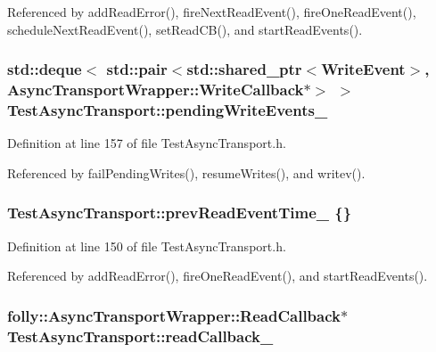 Referenced by add\+Read\+Error(), fire\+Next\+Read\+Event(), fire\+One\+Read\+Event(), schedule\+Next\+Read\+Event(), set\+Read\+C\+B(), and start\+Read\+Events().

\subsubsection[{pending\+Write\+Events\+\_\+}]{\setlength{\rightskip}{0pt plus 5cm}std\+::deque$<$ std\+::pair$<$std\+::shared\+\_\+ptr$<${\bf Write\+Event}$>$, Async\+Transport\+Wrapper\+::\+Write\+Callback$\ast$$>$ $>$ Test\+Async\+Transport\+::pending\+Write\+Events\+\_\+\hspace{0.3cm}{\ttfamily [private]}}\label{classTestAsyncTransport_a6fdd9f307a5b68f33fd5b19a46805661}


Definition at line 157 of file Test\+Async\+Transport.\+h.



Referenced by fail\+Pending\+Writes(), resume\+Writes(), and writev().

\subsubsection[{prev\+Read\+Event\+Time\+\_\+}]{ Test\+Async\+Transport\+::prev\+Read\+Event\+Time\+\_\+ \{\}\hspace{0.3cm}{\ttfamily [private]}}\label{classTestAsyncTransport_a4b24c8a65caff1ad61f87636d0371a64}


Definition at line 150 of file Test\+Async\+Transport.\+h.



Referenced by add\+Read\+Error(), fire\+One\+Read\+Event(), and start\+Read\+Events().

\subsubsection[{read\+Callback\+\_\+}]{\setlength{\rightskip}{0pt plus 5cm}folly\+::\+Async\+Transport\+Wrapper\+::\+Read\+Callback$\ast$ Test\+Async\+Transport\+::read\+Callback\+\_\+\hspace{0.3cm}{\ttfamily [private]}}\label{classTestAsyncTransport_a0fda776b1f7d17d58117109188de6776}


